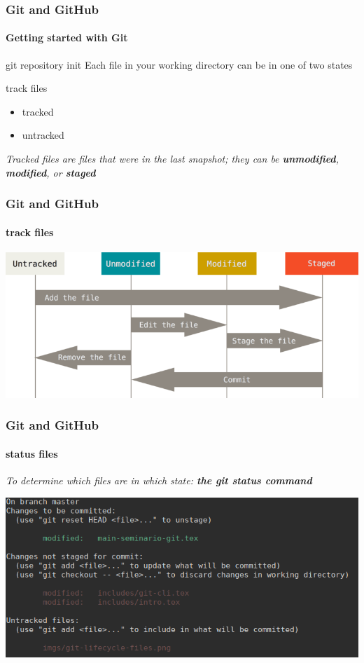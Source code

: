 \begin{frame}
    \frametitle{Git and GitHub}
    \framesubtitle{Getting started with Git}
    \addtocounter{nframe}{1}
	
	\begin{block}{git repository init}
		Each file in your working directory can be in one of two states
	\end{block}

	\begin{block}{track files}
		\begin{itemize}
			\item tracked
			\item untracked
		\end{itemize}
	\end{block}
	
	\textit{Tracked files are files that were in the last snapshot; they can be \textbf{unmodified}, \textbf{modified}, or \textbf{staged}}
    
\end{frame}

\begin{frame}
	\frametitle{Git and GitHub}
    \framesubtitle{track files}
    \addtocounter{nframe}{1}

	\begin{center}
		\includegraphics[width=.8\textwidth]{imgs/git-lifecycle-files.png}
	\end{center}

\end{frame}

\begin{frame}
	\frametitle{Git and GitHub}
    \framesubtitle{status files}
    \addtocounter{nframe}{1}

	\textit{To determine which files are in which state: \textbf{the git status command}}

	\begin{center}
		\includegraphics[width=.8\textwidth]{imgs/git-status.png}
	\end{center}

\end{frame}

